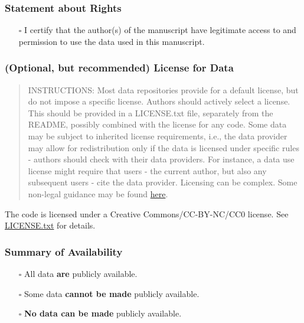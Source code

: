\documentclass[
]{article}
\providecommand{\tightlist}{%
  \setlength{\itemsep}{0pt}\setlength{\parskip}{0pt}}
\begin{document}
\hypertarget{statement-about-rights}{%
\subsubsection{Statement about Rights}\label{statement-about-rights}}

\begin{itemize}
\tightlist
\item[$\square$]
  I certify that the author(s) of the manuscript have legitimate access
  to and permission to use the data used in this manuscript.
\end{itemize}

\hypertarget{optional-but-recommended-license-for-data}{%
\subsubsection{(Optional, but recommended) License for
Data}\label{optional-but-recommended-license-for-data}}

\begin{quote}
INSTRUCTIONS: Most data repositories provide for a default license, but
do not impose a specific license. Authors should actively select a
license. This should be provided in a LICENSE.txt file, separately from
the README, possibly combined with the license for any code. Some data
may be subject to inherited license requirements, i.e., the data
provider may allow for redistribution only if the data is licensed under
specific rules - authors should check with their data providers. For
instance, a data use license might require that users - the current
author, but also any subsequent users - cite the data provider.
Licensing can be complex. Some non-legal guidance may be found
\href{https://social-science-data-editors.github.io/guidance/Licensing_guidance.html}{here}.
\end{quote}

The code is licensed under a Creative Commons/CC-BY-NC/CC0 license. See
\href{https://social-science-data-editors.github.io/template_README/LICENSE.txt}{LICENSE.txt}
for details.

\hypertarget{summary-of-availability}{%
\subsubsection{Summary of Availability}\label{summary-of-availability}}

\begin{itemize}
\tightlist
\item[$\square$]
  All data \textbf{are} publicly available.
\item[$\square$]
  Some data \textbf{cannot be made} publicly available.
\item[$\square$]
  \textbf{No data can be made} publicly available.
\end{itemize}
\end{document}

